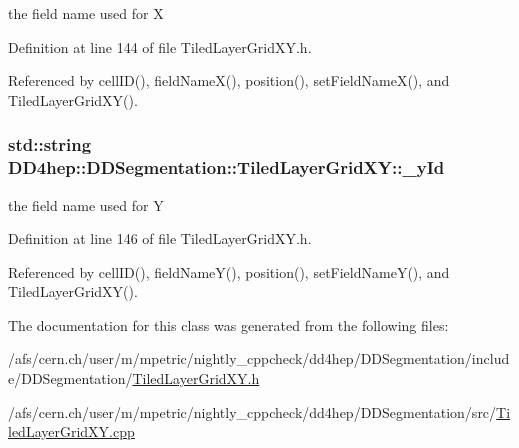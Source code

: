 the field name used for X 

Definition at line 144 of file TiledLayerGridXY.h.

Referenced by cellID(), fieldNameX(), position(), setFieldNameX(), and TiledLayerGridXY().\hypertarget{class_d_d4hep_1_1_d_d_segmentation_1_1_tiled_layer_grid_x_y_abcbef3de34c9e92a82bd8a6a5621aa63}{
\subsubsection[{\_\-yId}]{\setlength{\rightskip}{0pt plus 5cm}std::string {\bf DD4hep::DDSegmentation::TiledLayerGridXY::\_\-yId}}}
\label{class_d_d4hep_1_1_d_d_segmentation_1_1_tiled_layer_grid_x_y_abcbef3de34c9e92a82bd8a6a5621aa63}


the field name used for Y 

Definition at line 146 of file TiledLayerGridXY.h.

Referenced by cellID(), fieldNameY(), position(), setFieldNameY(), and TiledLayerGridXY().

The documentation for this class was generated from the following files:\begin{DoxyCompactItemize}
\item 
/afs/cern.ch/user/m/mpetric/nightly\_\-cppcheck/dd4hep/DDSegmentation/include/DDSegmentation/\hyperlink{_tiled_layer_grid_x_y_8h}{TiledLayerGridXY.h}\item 
/afs/cern.ch/user/m/mpetric/nightly\_\-cppcheck/dd4hep/DDSegmentation/src/\hyperlink{_tiled_layer_grid_x_y_8cpp}{TiledLayerGridXY.cpp}\end{DoxyCompactItemize}

